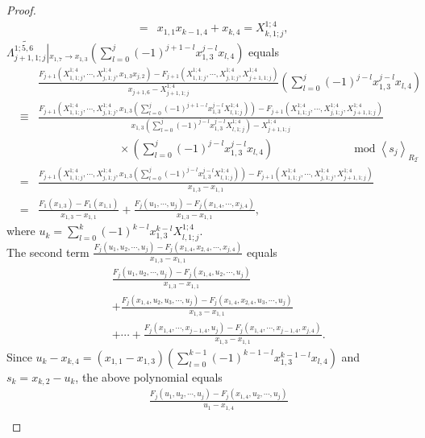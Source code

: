 \documentclass[10pt]{amsart}
\theoremstyle{break}
\begin{document}
\begin{proof}
\begin{eqnarray*}
&=&x_{1,1}x_{k-1,4}+x_{k,4}=X_{k,1;j}^{1;4},
\end{eqnarray*}
$\widetilde{\Lambda_{j+1,1;j}^{1;5,6}}\left|_{x_{1,7}\to x_{1,3}}\right.\left(\sum_{l=0}^{j}(-1)^{j+1-l}x_{1,3}^{j-l}x_{l,4}\right)$ equals
\begin{eqnarray*}
&&\frac{F_{j+1}(X_{1,1;j}^{1;4},\cdots,X_{j,1;j}^{1;4},x_{1,3}x_{j,2})-F_{j+1}(X_{1,1;j}^{1;4},\cdots,X_{j,1;j}^{1;4},X_{j+1,1;j}^{1;4})}{x_{j+1,6}-X_{j+1,1;j}^{1;4}}\left(\sum_{l=0}^{j}(-1)^{j-l}x_{1,3}^{j-l}x_{l,4}\right)\\
&\equiv&\frac{F_{j+1}(X_{1,1;j}^{1;4},\cdots,X_{j,1;j}^{1;4},x_{1,3}(\sum_{l=0}^{j}(-1)^{j+1-l}x_{1,3}^{j-l}X_{l,1;j}^{1;4}))-F_{j+1}(X_{1,1;j}^{1;4},\cdots,X_{j,1;j}^{1;4},X_{j+1,1;j}^{1;4})}{x_{1,3}(\sum_{l=0}^{j}(-1)^{j-l}x_{1,3}^{j-l}X_{l,1;j}^{1;4})-X_{j+1,1;j}^{1;4}}\\
&&\hspace{3cm}\times\left(\sum_{l=0}^{j}(-1)^{j-l}x_{1,3}^{j-l}x_{l,4}\right)\hspace{3cm}{{\mathrm{mod\;}}} \left<s_j\right>_{R_2\acute{}\,\acute{}}\\
&=&\frac{F_{j+1}(X_{1,1;j}^{1;4},\cdots,X_{j,1;j}^{1;4},x_{1,3}(\sum_{l=0}^{j}(-1)^{j-l}x_{1,3}^{j-l}X_{l,1;j}^{1;4}))-F_{j+1}(X_{1,1;j}^{1;4},\cdots,X_{j,1;j}^{1;4},X_{j+1,1;j}^{1;4})}{x_{1,3}-x_{1,1}}\\
&=&\frac{F_1(x_{1,3})-F_1(x_{1,1})}{x_{1,3}-x_{1,1}}+\frac{F_{j}(u_1,\cdots,u_j)-F_{j}(x_{1,4},\cdots,x_{j,4})}{x_{1,3}-x_{1,1}},
\end{eqnarray*}
where $\displaystyle u_k=\sum_{l=0}^{k}(-1)^{k-l}x_{1,3}^{k-l}X_{l,1;j}^{1;4}$.\\
The second term $\displaystyle\frac{F_{j}(u_1,u_2,\cdots,u_j)-F_{j}(x_{1,4},x_{2,4},\cdots,x_{j,4})}{x_{1,3}-x_{1,1}}$ equals
\begin{eqnarray*}
&&\frac{F_{j}(u_1,u_2,\cdots,u_j)-F_{j}(x_{1,4},u_2,\cdots,u_j)}{x_{1,3}-x_{1,1}}\\
&&+\frac{F_{j}(x_{1,4},u_2,u_3,\cdots,u_j)-F_{j}(x_{1,4},x_{2,4},u_3,\cdots,u_j)}{x_{1,3}-x_{1,1}}\\
&&+\cdots +\frac{F_{j}(x_{1,4},\cdots,x_{j-1,4},u_j)-F_{j}(x_{1,4},\cdots,x_{j-1,4},x_{j,4})}{x_{1,3}-x_{1,1}}.
\end{eqnarray*}
Since $u_k-x_{k,4}=(x_{1,1}-x_{1,3})\left(\sum_{l=0}^{k-1}(-1)^{k-1-l}x_{1,3}^{k-1-l}x_{l,4}\right)$ and $s_k=x_{k,2}-u_k$, the above polynomial equals
\begin{eqnarray*}
&&\frac{F_{j}(u_1,u_2,\cdots,u_j)-F_{j}(x_{1,4},u_2,\cdots,u_j)}{u_1-x_{1,4}}\\

\end{eqnarray*}
\end{proof}
\end{document}
